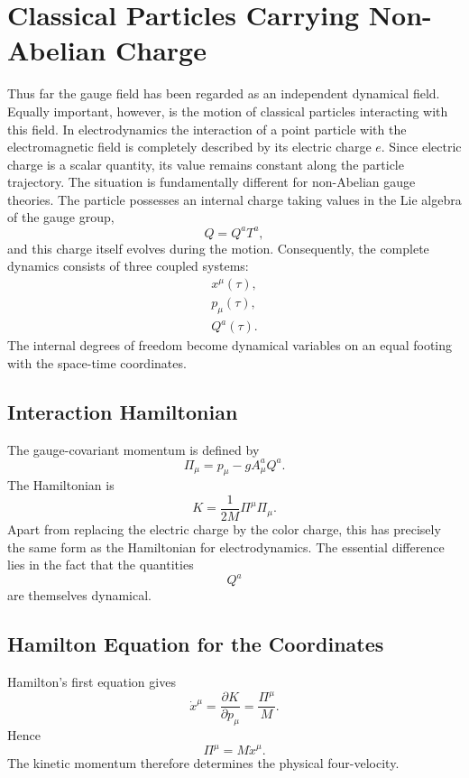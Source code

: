 \section{Classical Particles Carrying Non-Abelian Charge}
Thus far the gauge field has been regarded as an independent dynamical
field. Equally important, however, is the motion of classical particles
interacting with this field.
In electrodynamics the interaction of a point particle with the
electromagnetic field is completely described by its electric charge
\(e\). Since electric charge is a scalar quantity, its value remains
constant along the particle trajectory.
The situation is fundamentally different for non-Abelian gauge theories.
The particle possesses an internal charge taking values in the Lie
algebra of the gauge group,
\[Q=Q^aT^a,\]
and this charge itself evolves during the motion.
Consequently, the complete dynamics consists of three coupled systems:
\[\begin{aligned}
    x^\mu(\tau),\\p_\mu(\tau),\\Q^a(\tau).
\end{aligned}\]
The internal degrees of freedom become dynamical variables on an equal
footing with the space-time coordinates.
\subsection{Interaction Hamiltonian}
The gauge-covariant momentum is defined by
\[\boxed{\Pi_\mu=p_\mu-gA_\mu^aQ^a .}\]
The Hamiltonian is
\[\boxed{K=\frac{1}{2M}\Pi^\mu\Pi_\mu .}\]
Apart from replacing the electric charge by the color charge, this has
precisely the same form as the Hamiltonian for electrodynamics.
The essential difference lies in the fact that the quantities
\[Q^a\]
are themselves dynamical.
\subsection{Hamilton Equation for the Coordinates}
Hamilton's first equation gives
\[\boxed{\dot x^\mu=\frac{\partial K}{\partial p_\mu}=\frac{\Pi^\mu}{M}.}\]
Hence
\[\Pi^\mu=M\dot x^\mu .\]
The kinetic momentum therefore determines the physical four-velocity.
